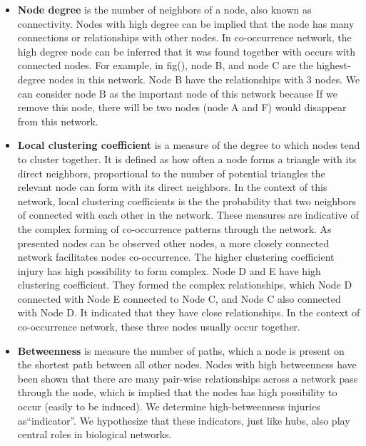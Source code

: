 \begin{itemize}

\item \textbf{Node degree} is the number of neighbors of a node, also known as connectivity. Nodes with high degree can be implied that the node has many connections or relationships with other nodes. In co-occurrence network, the high degree node can be inferred that it was found together with occurs with connected nodes. For example, in fig(), node B, and node C are the highest-degree nodes in this network. Node B have the relationships with 3 nodes. We can consider node B as the important node of this network because If we remove this node, there will be two nodes (node A and F) would disappear from this network.

\item \textbf{Local clustering coefficient} is a measure of the degree to which nodes tend to cluster together. It is defined as how often a node forms a triangle with its direct neighbors, proportional to the number of potential triangles the relevant node can form with its direct neighbors. In the context of this network, local clustering coefficients is the the probability that two neighbors of connected with each other in the network. These measures are indicative of the complex forming of co-occurrence patterns through the network. As presented nodes can be observed other nodes, a more closely connected network facilitates nodes co-occurrence. The higher clustering coefficient injury has high possibility to form complex. Node D and E have high clustering coefficient. They formed the complex relationships, which Node D connected with Node E connected to Node C, and Node C also connected with Node D. It indicated that they have close relationships. In the context of co-occurrence network, these three nodes usually occur together.

\item \textbf{Betweenness} is measure the number of paths, which a node is present on the shortest path between all other nodes. Nodes with high betweenness have been shown that there are many pair-wise relationships across a network pass through the node, which is implied that the nodes has high possibility to occur (easily to be induced). We determine high-betweenness injuries as``indicator''. We hypothesize that these indicators, just like hubs, also play central roles in biological networks. 

\end{itemize}

